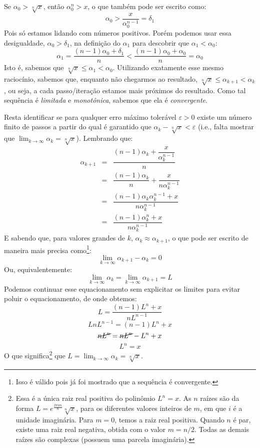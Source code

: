 \documentclass{article}
\begin{document}
Se $\alpha_0 > \sqrt[n]{x}$,
então $\alpha_0^n > x$,
o que também pode ser escrito como:
\[\alpha_0 > \dfrac{x}{\alpha_0^{n-1}} = \delta_1\]
Pois só estamos lidando com números positivos.
Porém podemos usar essa desigualdade, $\alpha_0 > \delta_1$,
na definição do $\alpha_1$
para descobrir que $\alpha_1 < \alpha_0$:
\[
  \alpha_1 = \dfrac{(n-1) \alpha_0 + \delta_1}{n}
  < \dfrac{(n-1) \alpha_0 + \alpha_0}{n} = \alpha_0
\]
Isto é, sabemos que $\sqrt[n]{x} \le \alpha_1 < \alpha_0$.
Utilizando exatamente esse mesmo raciocínio,
sabemos que, enquanto não chegarmos ao resultado,
$\sqrt[n]{x} \le \alpha_{k+1} < \alpha_k$,
ou seja, a cada passo/iteração estamos mais próximos do resultado.
Como tal sequência é \emph{limitada} e \emph{monotônica},
sabemos que ela é \emph{convergente}.

Resta identificar
se para qualquer erro máximo tolerável $\varepsilon > 0$
existe um número finito de passos a partir do qual é garantido que
$\alpha_k - \sqrt[n]{x} < \varepsilon$
(i.e., falta mostrar que $\lim_{k\to\infty} \alpha_k = \sqrt[n]{x}$).
Lembrando que:
\[
  \begin{array}{rcl}
  \alpha_{k+1}
  &=& \dfrac{(n-1) \alpha_k + \dfrac{x}{\alpha_k^{n-1}}}{n} \\[5mm]
  &=& \dfrac{(n-1) \alpha_k}{n} + \dfrac{x}{n\alpha_k^{n-1}} \\[5mm]
  &=& \dfrac{(n-1) \alpha_k \alpha_k^{n-1} + x}
            {n\alpha_k^{n-1}} \\[5mm]
  &=& \dfrac{(n-1) \alpha_k^n + x}{n\alpha_k^{n-1}}
  \end{array}
\]
E sabendo que,
para valores grandes de $k$, $\alpha_k \approx \alpha_{k+1}$,
o que pode ser escrito de maneira mais precisa como\footnote{
  Isso é válido pois já foi mostrado que a sequência é convergente.
}:
\[\lim_{k\to\infty} \alpha_{k+1} - \alpha_k = 0\]
Ou, equivalentemente:
\[\lim_{k\to\infty} \alpha_k = \lim_{k\to\infty} \alpha_{k+1} = L\]
Podemos continuar esse equacionamento
sem explicitar os limites para evitar poluir o equacionamento,
de onde obtemos:
\[L = \dfrac{(n-1) L^n + x}{n L^{n-1}}\]
\[L n L^{n-1} = (n-1) L^n + x\]
\[\cancel{nL^n} = \cancel{nL^n} - L^n + x\]
\[L^n = x\]
O que significa\footnote{
  Essa é a única raiz real positiva do polinômio $L^n = x$.
  As $n$ raízes são da forma
  $L = e^{\frac{2\pi i m}{n}} \sqrt[n]{x}$,
  para os diferentes valores inteiros de $m$,
  em que $i$ é a unidade imaginária.
  Para $m = 0$, temos a raiz real positiva.
  Quando $n$ é par, existe uma raiz real negativa,
  obtida com o valor $m = n/2$.
  Todas as demais raízes são complexas
  (possuem uma parcela imaginária).
} que $L = \lim_{k\to\infty} \alpha_k = \sqrt[n]{x}$.
\end{document}
